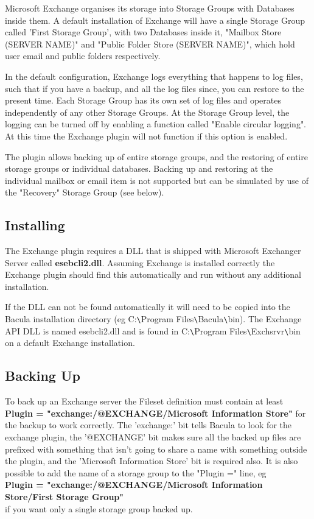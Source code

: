 Microsoft Exchange organises its storage into Storage Groups with
Databases inside them. A default installation of Exchange will have a
single Storage Group called 'First Storage Group', with two Databases
inside it, "Mailbox Store (SERVER NAME)" and 
"Public Folder Store (SERVER NAME)", 
which hold user email and public folders respectively.

In the default configuration, Exchange logs everything that happens to
log files, such that if you have a backup, and all the log files since,
you can restore to the present time. Each Storage Group has its own set
of log files and operates independently of any other Storage Groups. At
the Storage Group level, the logging can be turned off by enabling a
function called "Enable circular logging". At this time the Exchange
plugin will not function if this option is enabled.

The plugin allows backing up of entire storage groups, and the restoring
of entire storage groups or individual databases. Backing up and
restoring at the individual mailbox or email item is not supported but
can be simulated by use of the "Recovery" Storage Group (see below).

\subsection{Installing}
The Exchange plugin requires a DLL that is shipped with Microsoft
Exchanger Server called {\bf esebcli2.dll}. Assuming Exchange is installed
correctly the Exchange plugin should find this automatically and run
without any additional installation.

If the DLL can not be found automatically it will need to be copied into
the Bacula installation
directory (eg C:\verb+\+Program Files\verb+\+Bacula\verb+\+bin). The Exchange API DLL is
named esebcli2.dll and is found in C:\verb+\+Program Files\verb+\+Exchsrvr\verb+\+bin on a
default Exchange installation.

\subsection{Backing Up}
To back up an Exchange server the Fileset definition must contain at
least {\bf Plugin = "exchange:/@EXCHANGE/Microsoft Information Store"} for
the backup to work correctly. The 'exchange:' bit tells Bacula to look
for the exchange plugin, the '@EXCHANGE' bit makes sure all the backed
up files are prefixed with something that isn't going to share a name
with something outside the plugin, and the 'Microsoft Information Store'
bit is required also. It is also possible to add the name of a storage
group to the "Plugin =" line, eg \\
{\bf Plugin = "exchange:/@EXCHANGE/Microsoft Information Store/First Storage Group"} \\
if you want only a single storage group backed up.

